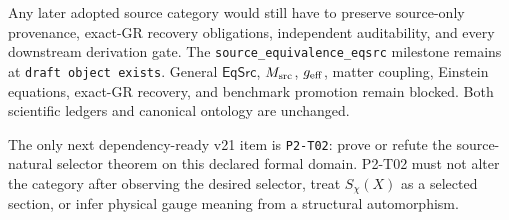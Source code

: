 \documentclass[11pt]{article}
\begin{document}
Any later adopted source category would still have to preserve source-only
provenance, exact-GR recovery obligations, independent auditability, and every
downstream derivation gate. The \texttt{source\_equivalence\_eqsrc} milestone
remains at \texttt{draft object exists}. General \(\mathsf{EqSrc}\),
\(M_{\rm src}\), \(g_{\rm eff}\), matter coupling, Einstein equations,
exact-GR recovery, and benchmark promotion remain blocked. Both scientific
ledgers and canonical ontology are unchanged.

The only next dependency-ready v21 item is \texttt{P2-T02}: prove or refute the
source-natural selector theorem on this declared formal domain. P2-T02 must not
alter the category after observing the desired selector, treat
\(S_{\chi}(X)\) as a selected section, or infer physical gauge meaning from a
structural automorphism.
\end{document}

